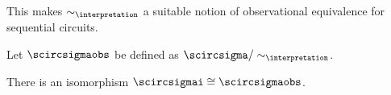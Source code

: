 This makes \(\sim_\interpretation\) a suitable notion of observational
equivalence for sequential circuits.

\begin{definition}
    Let \(\scircsigmaobs\) be defined as
    \(\scircsigma / \sim_{\interpretation}\).
\end{definition}

\begin{corollary}
    There is an isomorphism \(\scircsigmai \cong \scircsigmaobs\).
\end{corollary}